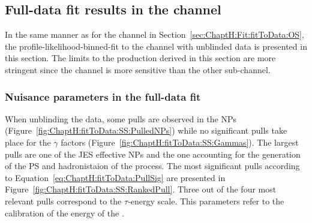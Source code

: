 
\FloatBarrier
\subsection{Full-data fit results in the \dilepSStau channel}
\label{sec:ChaptH:Fit:fitToData:SS}
In the same manner as for the \dilepOStau channel in Section~\ref{sec:ChaptH:Fit:fitToData:OS},
the profile-likelihood-binned-fit to the \dilepSStau channel with unblinded data is presented
in this section. The limits to the \tHq production derived in this section are more stringent since
the \dilepSStau channel is more sensitive than the other sub-channel. 

\subsubsection{Nuisance parameters in the \dilepSStau full-data fit}
\label{sec:ChaptH:Fit:FullFit:SS:NPs}
When unblinding the data, some pulls are observed in the NPs (Figure~\ref{fig:ChaptH:fitToData:SS:PulledNPs})
while no significant pulls take place for the $\gamma$ factors (Figure~\ref{fig:ChaptH:fitToData:SS:Gammas}). 
The largest pulls are one of the JES effective NPs and the one accounting
for the generation of the PS and hadronistaion of the \ttbar process. 
The most significant pulls according to Equation~\ref{eq:ChaptH:fitToData:PullSig} are presented in Figure~\ref{fig:ChaptH:fitToData:SS:RankedPull}. Three out of the four most relevant pulls correspond
to the $\tau$-energy scale. This parameters refer to the calibration of the energy of the \tauhad.


